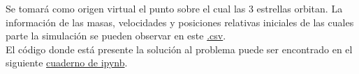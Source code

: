 \documentclass[11pt,a4paper]{article}
\begin{document}
{Se tomará como origen virtual el punto sobre el cual las 3 estrellas orbitan. La información de las masas, velocidades y posiciones relativas iniciales de las cuales parte la simulación se pueden observar en este \href{https://github.com/diegolramirez/MC/blob/master/Proyecto/datos.csv}{.csv}.\\

El código donde está presente la solución al problema puede ser encontrado en el siguiente \href{https://github.com/diegolramirez/MC/blob/master/Proyecto/proyecto.ipynb}{cuaderno de ipynb}.
}
\end{document}
